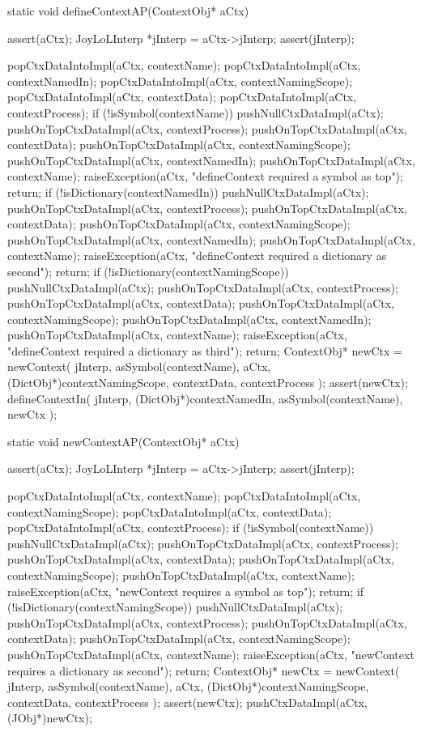 \startCCode
static void defineContextAP(ContextObj* aCtx) {
  assert(aCtx);
  JoyLoLInterp *jInterp = aCtx->jInterp;
  assert(jInterp);
  
  popCtxDataIntoImpl(aCtx, contextName);
  popCtxDataIntoImpl(aCtx, contextNamedIn);
  popCtxDataIntoImpl(aCtx, contextNamingScope);
  popCtxDataIntoImpl(aCtx, contextData);
  popCtxDataIntoImpl(aCtx, contextProcess);
  if (!isSymbol(contextName)) {
    pushNullCtxDataImpl(aCtx);
    pushOnTopCtxDataImpl(aCtx, contextProcess);
    pushOnTopCtxDataImpl(aCtx, contextData);
    pushOnTopCtxDataImpl(aCtx, contextNamingScope);
    pushOnTopCtxDataImpl(aCtx, contextNamedIn);
    pushOnTopCtxDataImpl(aCtx, contextName);
    raiseException(aCtx,
      "defineContext required a symbol as top");
    return;
  }
  if (!isDictionary(contextNamedIn)) {
    pushNullCtxDataImpl(aCtx);
    pushOnTopCtxDataImpl(aCtx, contextProcess);
    pushOnTopCtxDataImpl(aCtx, contextData);
    pushOnTopCtxDataImpl(aCtx, contextNamingScope);
    pushOnTopCtxDataImpl(aCtx, contextNamedIn);
    pushOnTopCtxDataImpl(aCtx, contextName);
    raiseException(aCtx,
      "defineContext required a dictionary as second");
    return;
  }
  if (!isDictionary(contextNamingScope)) {
    pushNullCtxDataImpl(aCtx);
    pushOnTopCtxDataImpl(aCtx, contextProcess);
    pushOnTopCtxDataImpl(aCtx, contextData);
    pushOnTopCtxDataImpl(aCtx, contextNamingScope);
    pushOnTopCtxDataImpl(aCtx, contextNamedIn);
    pushOnTopCtxDataImpl(aCtx, contextName);
    raiseException(aCtx,
      "defineContext required a dictionary as third");
    return;
  }
  ContextObj* newCtx = newContext(
    jInterp,
    asSymbol(contextName),
    aCtx,
    (DictObj*)contextNamingScope,
    contextData,
    contextProcess
  );
  assert(newCtx);
  defineContextIn(
    jInterp,
    (DictObj*)contextNamedIn,
    asSymbol(contextName),
    newCtx
  );
}
\stopCCode

\startCCode
static void newContextAP(ContextObj* aCtx) {
  assert(aCtx);
  JoyLoLInterp *jInterp = aCtx->jInterp;
  assert(jInterp);

  popCtxDataIntoImpl(aCtx, contextName);
  popCtxDataIntoImpl(aCtx, contextNamingScope);
  popCtxDataIntoImpl(aCtx, contextData);
  popCtxDataIntoImpl(aCtx, contextProcess);
  if (!isSymbol(contextName)) {
    pushNullCtxDataImpl(aCtx);
    pushOnTopCtxDataImpl(aCtx, contextProcess);
    pushOnTopCtxDataImpl(aCtx, contextData);
    pushOnTopCtxDataImpl(aCtx, contextNamingScope);
    pushOnTopCtxDataImpl(aCtx, contextName);
    raiseException(aCtx,
      "newContext requires a symbol as top");
    return;
  }
  if (!isDictionary(contextNamingScope)) {
    pushNullCtxDataImpl(aCtx);
    pushOnTopCtxDataImpl(aCtx, contextProcess);
    pushOnTopCtxDataImpl(aCtx, contextData);
    pushOnTopCtxDataImpl(aCtx, contextNamingScope);
    pushOnTopCtxDataImpl(aCtx, contextName);
    raiseException(aCtx,
      "newContext requires a dictionary as second");
    return;
  }
  ContextObj* newCtx = newContext(
    jInterp,
    asSymbol(contextName),
    aCtx,
    (DictObj*)contextNamingScope,
    contextData,
    contextProcess
  );
  assert(newCtx);
  pushCtxDataImpl(aCtx, (JObj*)newCtx);
}
\stopCCode


